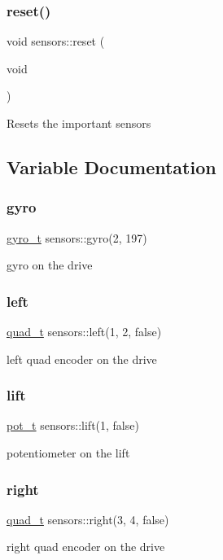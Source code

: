 \subsubsection{\texorpdfstring{reset()}{reset()}}
{\footnotesize\ttfamily void sensors\+::reset (\begin{DoxyParamCaption}\item[{void}]{ }\end{DoxyParamCaption})}

Resets the important sensors 

\subsection{Variable Documentation}
\mbox{\label{namespacesensors_ad1473b3f557dd776bed79a4a739559e3}} 
\subsubsection{\texorpdfstring{gyro}{gyro}}
{\footnotesize\ttfamily \hyperlink{classsensors_1_1gyro__t}{gyro\+\_\+t} sensors\+::gyro(2, 197)}

gyro on the drive \mbox{\label{namespacesensors_aa9b039f7a72fdb7faf156b830ca76772}} 
\subsubsection{\texorpdfstring{left}{left}}
{\footnotesize\ttfamily \hyperlink{structsensors_1_1quad__t}{quad\+\_\+t} sensors\+::left(1, 2, false)}

left quad encoder on the drive \mbox{\label{namespacesensors_a846dce2ebdbd35cd6abdbd3173dfb289}} 
\subsubsection{\texorpdfstring{lift}{lift}}
{\footnotesize\ttfamily \hyperlink{structsensors_1_1pot__t}{pot\+\_\+t} sensors\+::lift(1, false)}

potentiometer on the lift \mbox{\label{namespacesensors_a06fce5712cbec0620a46dcf679f03e43}} 
\subsubsection{\texorpdfstring{right}{right}}
{\footnotesize\ttfamily \hyperlink{structsensors_1_1quad__t}{quad\+\_\+t} sensors\+::right(3, 4, false)}

right quad encoder on the drive 